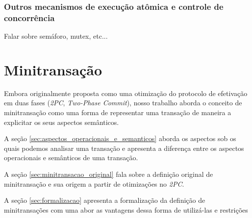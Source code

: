 \documentclass[11pt,twoside,a4paper]{book}
\begin{document}
\subsection{Outros mecanismos de execução atômica e controle de concorrência}
\label{subsec:outros_mecanismos}

Falar sobre semáforo, mutex, etc...

\chapter{Minitransação}
\label{chap:minitransacao}

Embora originalmente proposta como uma otimização do protocolo de efetivação em duas fases (\emph{2PC}, \emph{Two-Phase Commit}), nosso trabalho aborda o conceito de minitransação como uma forma de representar uma transação de maneira a explicitar os seus aspectos semânticos.

A seção \ref{sec:aspectos_operacionais_e_semanticos} aborda os aspectos sob os quais podemos analisar uma transação e apresenta a diferença entre os aspectos operacionais e semânticos de uma transação.

A seção \ref{sec:minitransacao_original} fala sobre a definição original de minitransação e sua origem a partir de otimizações no \emph{2PC}.

A seção \ref{sec:formalizacao} apresenta a formalização da definição de minitransações com uma abor as vantagens dessa forma de utilizá-las e restrições 




\end{document}
